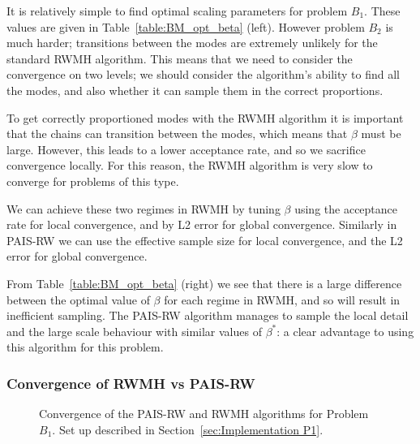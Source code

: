 \documentclass[final]{siamltex}
\begin{document}
It is relatively simple to find optimal scaling parameters for problem $B_1$. These values are given in Table~\ref{table:BM_opt_beta} (left). However problem $B_2$ is much harder; transitions between the modes are extremely unlikely for the standard RWMH algorithm. This means that we need to consider the
convergence on two levels; we should consider the algorithm's ability
to find all the modes, and also whether it can sample them in the correct proportions.

To get correctly proportioned modes with the RWMH algorithm it is
important that the chains can transition between the modes, which
means that $\beta$ must be large. However, this leads to a lower
acceptance rate, and so we sacrifice convergence locally. For this reason, the RWMH algorithm is very slow to
converge for problems of this type.

We can achieve these two regimes in RWMH by tuning $\beta$ using the acceptance rate for local convergence, and by L2 error for global convergence. Similarly in PAIS-RW we can use the effective sample size for local convergence, and the L2 error for global convergence.

From Table~\ref{table:BM_opt_beta} (right) we see that there is a large difference between the optimal value of $\beta$ for each regime in RWMH, and so will result in inefficient sampling. The PAIS-RW algorithm manages to sample the local detail and the large scale behaviour with similar values of $\beta^*$: a clear advantage to using this algorithm for this problem.

\subsubsection{Convergence of RWMH vs PAIS-RW}


\begin{figure}[htb]
\centering
{}
\caption{Convergence of the PAIS-RW and RWMH algorithms for Problem $B_1$. Set up described in Section~\ref{sec:Implementation P1}.}
\label{fig:BM1_L2}
\end{figure}
\end{document}
